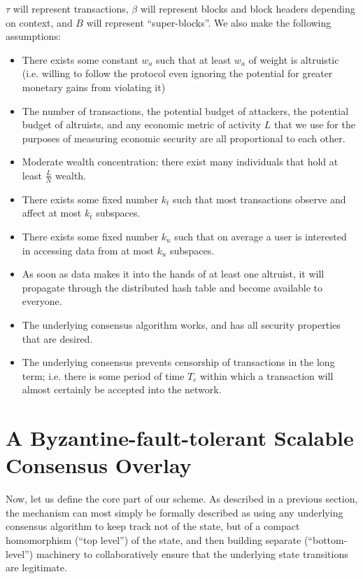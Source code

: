 \documentclass[11pt,a4paper]{article}
\makeatletter
\theoremstyle{plain}
\theoremstyle{definition}
\theoremstyle{remark}
\newcommand{\ie}{i.e.\@\xspace}
\makeatother
\begin{document}
$\tau$ will represent transactions, $\beta$ will represent blocks and block headers depending on context, and $B$ will represent ``super-blocks''. We also make the following assumptions:

\begin{itemize}
\item
There exists some constant $w_a$ such that at least $w_a$ of weight is altruistic (\ie willing to follow the protocol even ignoring the potential for greater monetary gains from violating it)
\item
The number of transactions, the potential budget of attackers, the potential budget of altruists, and any economic metric of activity $L$ that we use for the purposes of measuring economic security are all proportional to each other.
\item
Moderate wealth concentration: there exist many individuals that hold at least $\frac{L}{N}$ wealth.
\item
There exists some fixed number $k_t$ such that most transactions observe and affect at most $k_t$ subspaces.
\item
There exists some fixed number $k_u$ such that on average a user is interested in accessing data from at most $k_u$ subspaces.
\item
As soon as data makes it into the hands of at least one altruist, it will propagate through the distributed hash table and become available to everyone.
\item
The underlying consensus algorithm works, and has all security properties that are desired.
\item
The underlying consensus prevents censorship of transactions in the long term; \ie there is some period of time $T_c$ within which a transaction will almost certainly be accepted into the network.
\end{itemize}

\section{A Byzantine-fault-tolerant Scalable Consensus Overlay}

Now, let us define the core part of our scheme. As described in a previous section, the mechanism can most simply be formally described as using any underlying consensus algorithm to keep track not of the state, but of a compact homomorphism (``top level'') of the state, and then building separate (``bottom-level'') machinery to collaboratively ensure that the underlying state transitions are legitimate.
\end{document}
